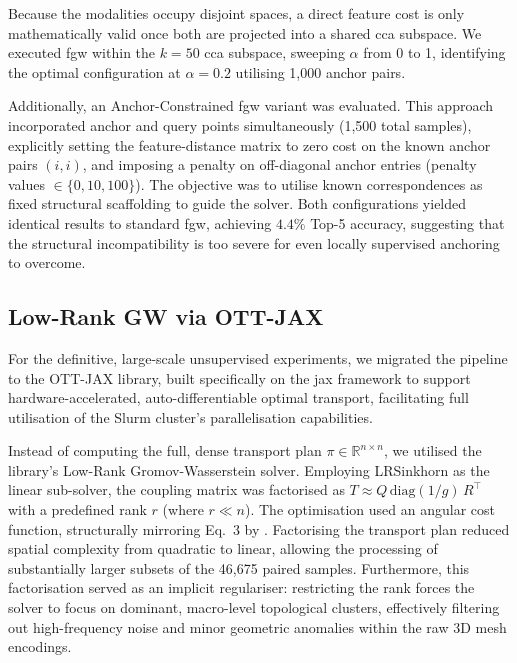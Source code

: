 Because the modalities occupy disjoint spaces, a direct feature cost is only mathematically valid once both are projected into a shared \gls{cca} subspace. We executed \gls{fgw} within the $k=50$ \gls{cca} subspace, sweeping $\alpha$ from 0 to 1, identifying the optimal configuration at $\alpha = 0.2$ utilising 1,000 anchor pairs.

Additionally, an Anchor-Constrained \gls{fgw} variant was evaluated. This approach incorporated anchor and query points simultaneously (1,500 total samples), explicitly setting the feature-distance matrix to zero cost on the known anchor pairs $(i,i)$, and imposing a penalty on off-diagonal anchor entries (penalty values $\in \{0, 10, 100\}$). The objective was to utilise known correspondences as fixed structural scaffolding to guide the solver. Both configurations yielded identical results to standard \gls{fgw}, achieving $4.4\%$ Top-5 accuracy, suggesting that the structural incompatibility is too severe for even locally supervised anchoring to overcome.

\subsection{Low-Rank GW via OTT-JAX}
\label{subsec:low_rank_gw}

For the definitive, large-scale unsupervised experiments, we migrated the pipeline to the OTT-JAX library, built specifically on the \gls{jax} framework to support hardware-accelerated, auto-differentiable optimal transport, facilitating full utilisation of the Slurm cluster's parallelisation capabilities.

Instead of computing the full, dense transport plan $\pi \in \mathbb{R}^{n \times n}$, we utilised the library's Low-Rank Gromov-Wasserstein solver. Employing LRSinkhorn as the linear sub-solver, the coupling matrix was factorised as $T \approx Q\,\text{diag}(1/g)\,R^\top$ with a predefined rank $r$ (where $r \ll n$). The optimisation used an angular cost function, structurally mirroring Eq.~3 by \textcite{li2026scale}. Factorising the transport plan reduced spatial complexity from quadratic to linear, allowing the processing of substantially larger subsets of the 46,675 paired samples. Furthermore, this factorisation served as an implicit regulariser: restricting the rank forces the solver to focus on dominant, macro-level topological clusters, effectively filtering out high-frequency noise and minor geometric anomalies within the raw 3D mesh encodings.


